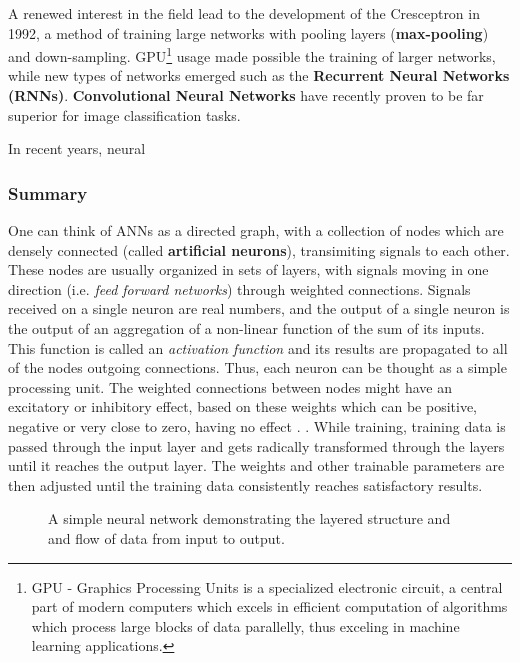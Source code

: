 A renewed interest in the field lead to the development of the
Cresceptron \cite{article:Cresceptron} in 1992, a method of training
large networks with pooling layers (\textbf{max-pooling}) and down-sampling.
GPU\footnote{GPU - Graphics Processing Units is a specialized
electronic circuit, a central part of modern computers which excels in
efficient computation of algorithms which process large blocks of data
parallelly, thus exceling in machine learning applications.} usage made
possible the training of larger networks, while new types of networks
emerged such as the \textbf{Recurrent Neural Networks (RNNs)}.
\textbf{Convolutional Neural Networks} have recently proven to be
far superior for image classification tasks.

In recent years, neural 


\subsubsection{Summary}

One can think of ANNs as a directed graph, with a collection of nodes
which are densely connected (called \textbf{artificial neurons}),
transimiting signals to each other. These nodes are usually organized
in sets of layers, with signals moving in one direction
(i.e. \textit{feed forward networks}) through weighted connections.
Signals received on a single neuron are real numbers, and the output
of a single neuron is the output of an aggregation of a non-linear
function of the sum of its inputs. This function is called an
\textit{activation function} and its results are propagated to all of
the nodes outgoing connections.  Thus, each neuron can be thought as a
simple processing unit. The weighted connections between nodes might
have an excitatory or inhibitory effect, based on these weights which
can be positive, negative or very close to zero, having no effect
\cite[Chap. ~ 1]{book:Gurney1997AnIT}.  .  While training, training
data is passed through the input layer and gets radically transformed
through the layers until it reaches the output layer. The weights and
other trainable parameters are then adjusted until the training data
consistently reaches satisfactory results.

\begin{figure}[h!]
  \centering
  \scalebox{.8}{}
  \caption{A simple neural network demonstrating the layered structure and
  and flow of data from input to output.}
  \label{fig:simple_nn_demo}
\end{figure}
\newpage
